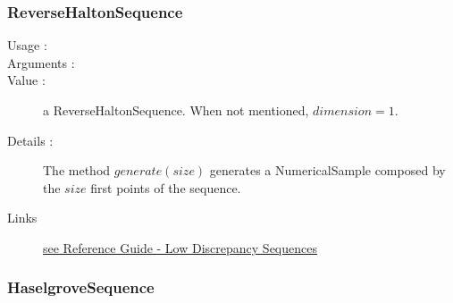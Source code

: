 
\newpage  \subsubsection{ReverseHaltonSequence}

\begin{description}

\item[Usage :] \rule{0pt}{1em}

\item[Arguments :]  \rule{0pt}{1em}

\item[Value :] a ReverseHaltonSequence. When not mentioned, $dimension=1$.

\item[Details :]  The method $generate(size)$ generates a NumericalSample composed by the $size$ first points of the sequence.


\item[Links] \rule{0pt}{1em}
  \href{OpenTURNS_ReferenceGuide.pdf}{see Reference Guide - Low Discrepancy Sequences}
\end{description}



\newpage  \subsubsection{HaselgroveSequence}

